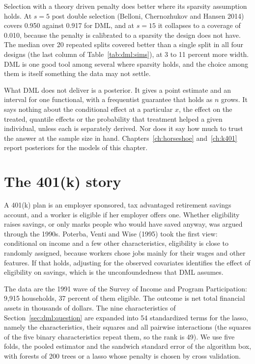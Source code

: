 Selection with a theory driven penalty does better where its sparsity assumption holds. At $s = 5$ post double selection (Belloni, Chernozhukov and Hansen 2014) covers 0.950 against 0.917 for DML, and at $s = 15$ it collapses to a coverage of 0.010, because the penalty is calibrated to a sparsity the design does not have. The median over 20 repeated splits covered better than a single split in all four designs (the last column of Table~\ref{tab:dml:sims}), at 3 to 11 percent more width. DML is one good tool among several where sparsity holds, and the choice among them is itself something the data may not settle.

What DML does not deliver is a posterior. It gives a point estimate and an interval for one functional, with a frequentist guarantee that holds as $n$ grows. It says nothing about the conditional effect at a particular $x$, the effect on the treated, quantile effects or the probability that treatment helped a given individual, unless each is separately derived. Nor does it say how much to trust the answer at the sample size in hand. Chapters~\ref{ch:horseshoe} and~\ref{ch:k401} report posteriors for the models of this chapter.

\section{The 401(k) story}\label{sec:dml:k401}

A 401(k) plan is an employer sponsored, tax advantaged retirement savings account, and a worker is eligible if her employer offers one. Whether eligibility raises savings, or only marks people who would have saved anyway, was argued through the 1990s. Poterba, Venti and Wise (1995) took the first view: conditional on income and a few other characteristics, eligibility is close to randomly assigned, because workers chose jobs mainly for their wages and other features. If that holds, adjusting for the observed covariates identifies the effect of eligibility on savings, which is the unconfoundedness that DML assumes.

The data are the 1991 wave of the Survey of Income and Program Participation: 9,915 households, 37 percent of them eligible. The outcome is net total financial assets in thousands of dollars. The nine characteristics of Section~\ref{sec:dml:question} are expanded into 54 standardized terms for the lasso, namely the characteristics, their squares and all pairwise interactions (the squares of the five binary characteristics repeat them, so the rank is 49).  We use five folds, the pooled estimator and the sandwich standard error of the algorithm box, with forests of 200 trees or a lasso whose penalty is chosen by cross validation.

